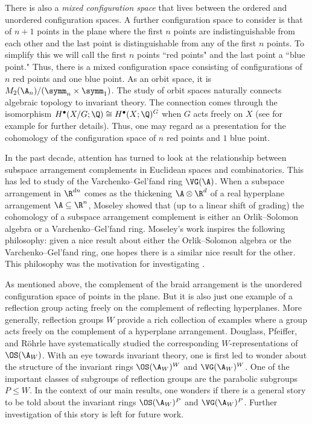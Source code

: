 \documentclass{amsart}
\begin{document}
There is also a \textit{mixed configuration space} that lives between the ordered and unordered configuration spaces.
A further configuration space to consider is that of $n+1$ points in the plane where the first $n$ points are indistinguishable from each other and the last point is distinguishable from any of the first $n$ points. 
To simplify this we will call the first $n$ points ``red points" and the last point a ``blue point." Thus, there is a mixed configuration space consisting of configurations of $n$ red points and one blue point.
As an orbit space, it is $M_2(\A_n)/(\symm_{n} \times \symm_1)$.
The study of orbit spaces naturally connects algebraic topology to invariant theory.
The connection comes through the isomorphism $H^\bullet(X/G;\Q) \cong H^\bullet(X;\Q)^G$ when $G$ acts freely on $X$ (see for example \cite[Section~3.G]{hatcher} for further details).
Thus, one may regard  as a presentation for the cohomology of the configuration space of $n$ red points and $1$ blue point.

In the past decade, attention has turned to look at the relationship between subspace arrangement complements in Euclidean spaces and combinatorics.
This has led to study of the Varchenko--Gel'fand ring $\VG(\A)$.
When a subspace arrangement in $\R^{d n}$ comes as the thickening $\A \otimes \R^d$ of a real hyperplane arrangement $\A \subseteq \R^n$, Moseley showed that (up to a linear shift of grading) the cohomology of a subspace arrangement complement is either an Orlik--Solomon algebra or a Varchenko--Gel'fand ring.
Moseley's work inspires the following philosophy: given a nice result about either the Orlik--Solomon algebra or the Varchenko--Gel'fand ring, one hopes there is a similar nice result for the other.
This philosophy was the motivation for investigating .

As mentioned above, the complement of the braid arrangement is the unordered configuration space of points in the plane.
But it is also just one example of a reflection group acting freely on the complement of reflecting hyperplanes.
More generally, reflection groups $W$ provide a rich collection of examples where a group acts freely on the complement of a hyperplane arrangement.
Douglass, Pfeiffer, and R\"ohrle \cite{douglass-pfeiffer-roehrle-20,douglass-pfeiffer-roehrle-25} have systematically studied the corresponding $W$-representations of $\OS(\A_W)$.
With an eye towards invariant theory, one is first led to wonder about the structure of the invariant rings $\OS(\A_W)^W$ and $\VG(\A_W)^W$.
One of the important classes of subgroups of reflection groups are the parabolic subgroups $P \leq W$.
In the context of our main results, one wonders if there is a general story to be told about the invariant rings $\OS(\A_W)^P$ and $\VG(\A_W)^P$.
Further investigation of this story is left for future work.
\end{document}
